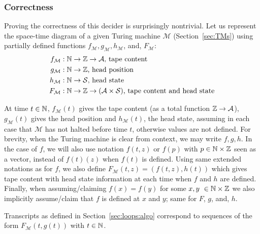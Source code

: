 \subsubsection{Correctness}
Proving the correctness of this decider is surprisingly nontrivial. Let us represent the space-time diagram of a given Turing machine $\mathcal{M}$ (Section~\ref{sec:TMs}) using partially defined functions $f_\mathcal{M},g_\mathcal{M},h_\mathcal{M}$, and, $F_\mathcal{M}$:
\begin{align*}
    f_\mathcal{M} & : \mathbb{N} \to \mathbb{Z} \to \mathcal{A}\text{, tape content}                                \\
    g_\mathcal{M} & : \mathbb{N} \to \mathbb{Z}\text{, head position}                                             \\
    h_\mathcal{M} & : \mathbb{N} \to \mathcal{S}\text{, head state}                                           \\
    F_\mathcal{M} & : \mathbb{N} \to \mathbb{Z} \to (\mathcal{A}\times \mathcal{S})\text{, tape content and head state}
\end{align*}

\newcommand{\baref}{F}

At time $t\in\mathbb{N}$, $f_\mathcal{M}(t)$ gives the tape content (as a total function $\mathbb{Z} \to \mathcal{A}$), $g_\mathcal{M}(t)$ gives the head position and $h_\mathcal{M}(t)$, the head state, assuming in each case that $\mathcal{M}$ has not halted before time $t$, otherwise values are not defined. For brevity, when the Turing machine is clear from context, we may write $f,g,h$. In the case of $f$, we will also use notation $f(t,z)$ or $f(p)$ with $p \in \mathbb{N} \times \mathbb{Z}$ seen as a vector, instead of $f(t)(z)$ when $f(t)$ is defined. Using same extended notations as for $f$, we also define $\baref_\mathcal{M}(t,z) = (f(t,z),h(t))$ which gives tape content with head state information at each time when $f$ and $h$ are defined.
Finally, when assuming/claiming $f(x) = f(y)$ for some $x,y \in \N \times \Z$ we also implicitly assume/claim that $f$ is defined at $x$ and $y$; same for $\baref$, $g$, and, $h$.

Transcripts as defined in Section~\ref{sec:loops:algo} correspond to sequences of the form $F_\mathcal{M}(t,g(t))$ with $t\in\mathbb{N}$.


